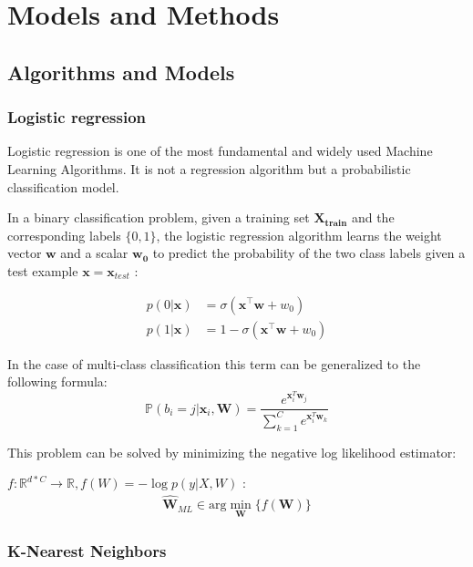 \documentclass[10pt,conference,compsocconf]{IEEEtran}
\begin{document}
\section{Models and Methods}
\subsection{Algorithms and Models}

\subsubsection{Logistic regression}

Logistic regression is one of the most fundamental and widely used Machine Learning Algorithms. It is not a regression algorithm but a probabilistic classification model.

In a binary classification problem, given a training set $\mathbf{X_{train}}$ and the corresponding labels $\{0, 1\}$, the logistic regression algorithm learns the weight vector $\mathbf{w}$ and a scalar $\mathbf{w_0}$ to predict the probability of the two class labels given a test example $\mathbf{x} = \mathbf{x}_{test}$ \cite{epfl_ml_cs}:

\begin{align*}
p(0 | \mathbf{x}) &= \sigma(\mathbf{x^\top}  \mathbf{w} + w_0)
\\
p(1 | \mathbf{x}) &= 1 - \sigma(\mathbf{x^\top}  \mathbf{w} + w_0)
\end{align*}

In  the case of multi-class classification this term can be generalized to the following formula:
\begin{equation*}
\mathbb{P}(b_{i} = j | \mathbf{x}_{i}, \mathbf{W}) = \frac{e^{\mathbf{x}_{i}^{T}\mathbf{w}_{j}}}{\sum_{k=1}^{C}e^{\mathbf{x}_{i}^{T}\mathbf{w}_{k}}}
    \label{eqn:plr}
\end{equation*}

This problem can be solved by minimizing the negative log likelihood estimator:

$ f: \mathbb{R}^{d*C} \rightarrow \mathbb{R}, f(W) = -\log p(y | X, W)$ : 
\begin{align*}
    \mathbf{\hat{W}}_{ML} \in \text{arg}\min_{\mathbf{W}}\{f(\mathbf{W}) \}
\end{align*}

\subsubsection{K-Nearest Neighbors}
\end{document}
